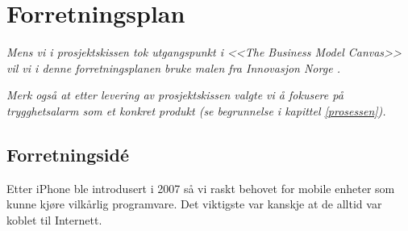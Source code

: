 %
%
%
%





\chapter{Forretningsplan}

\textit{Mens vi i prosjektskissen tok utgangspunkt i \textit{<<The Business Model
Canvas>>} \cite{osterwalder} vil vi i denne forretningsplanen bruke malen fra
Innovasjon Norge \cite{innovasjon.norge}.}

\textit{Merk også at etter levering av prosjektskissen valgte vi å fokusere på
trygghetsalarm som et konkret produkt (se begrunnelse i kapittel
\vref{prosessen}).}

\section{Forretningsidé}

Etter iPhone ble introdusert i 2007 så vi raskt behovet for mobile enheter som
kunne kjøre vilkårlig programvare. Det viktigste var kanskje at de alltid var
koblet til Internett.

